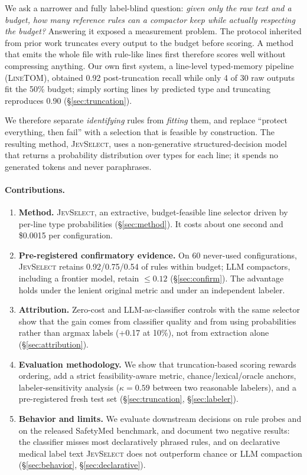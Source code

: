\documentclass[11pt,a4paper]{article}
\newcommand{\sel}{\textsc{JevSelect}}
\newcommand{\linetom}{\textsc{LineTOM}}
\begin{document}
We ask a narrower and fully label-blind question: \emph{given only the raw text and a budget, how many reference rules can a compactor keep while actually respecting the budget?} Answering it exposed a measurement problem. The protocol inherited from prior work truncates every output to the budget before scoring. A method that emits the whole file with rule-like lines first therefore scores well without compressing anything. Our own first system, a line-level typed-memory pipeline (\linetom), obtained 0.92 post-truncation recall while only 4 of 30 raw outputs fit the 50\% budget; simply sorting lines by predicted type and truncating reproduces 0.90 (\S\ref{sec:truncation}).

We therefore separate \emph{identifying} rules from \emph{fitting} them, and replace ``protect everything, then fail'' with a selection that is feasible by construction. The resulting method, \sel{}, uses a non-generative structured-decision model \citep{typesafe2026jev} that returns a probability distribution over types for each line; it spends no generated tokens and never paraphrases.

\paragraph{Contributions.}
\begin{enumerate}
\item \textbf{Method.} \sel{}, an extractive, budget-feasible line selector driven by per-line type probabilities (\S\ref{sec:method}). It costs about one second and \$0.0015 per configuration.
\item \textbf{Pre-registered confirmatory evidence.} On 60 never-used configurations, \sel{} retains 0.92/0.75/0.54 of rules within budget; LLM compactors, including a frontier model, retain $\le 0.12$ (\S\ref{sec:confirm}). The advantage holds under the lenient original metric and under an independent labeler.
\item \textbf{Attribution.} Zero-cost and LLM-as-classifier controls with the same selector show that the gain comes from classifier quality and from using probabilities rather than argmax labels (+0.17 at 10\%), not from extraction alone (\S\ref{sec:attribution}).
\item \textbf{Evaluation methodology.} We show that truncation-based scoring rewards ordering, add a strict feasibility-aware metric, chance/lexical/oracle anchors, labeler-sensitivity analysis ($\kappa=0.59$ between two reasonable labelers), and a pre-registered fresh test set (\S\ref{sec:truncation}, \S\ref{sec:labeler}).
\item \textbf{Behavior and limits.} We evaluate downstream decisions on rule probes and on the released SafetyMed benchmark, and document two negative results: the classifier misses most declaratively phrased rules, and on declarative medical label text \sel{} does not outperform chance or LLM compaction (\S\ref{sec:behavior}, \S\ref{sec:declarative}).
\end{enumerate}
\end{document}
